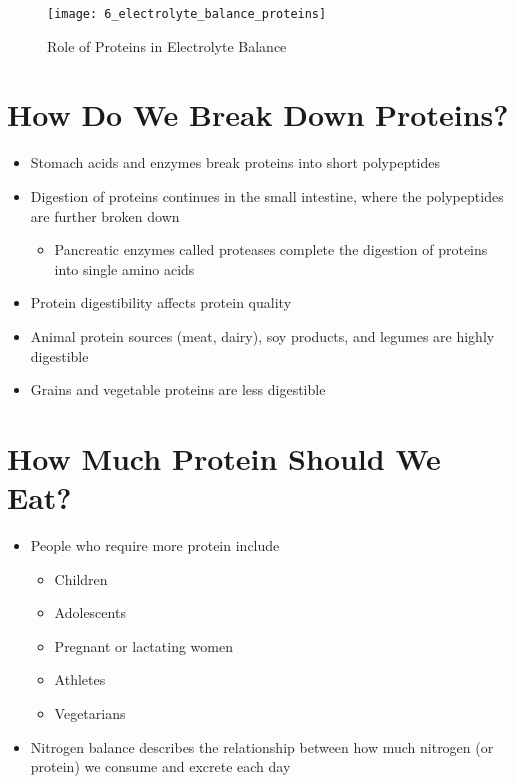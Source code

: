 \documentclass[title={Chapter 6}]{fdsn201notes}
\begin{document}
\begin{figure}[H]
	\centering
	\texttt{[image: 6\_electrolyte\_balance\_proteins]}
	\caption{Role of Proteins in Electrolyte Balance}
	\label{fig:role-of-proteins-in-electrolyte-balance}
\end{figure}

\section{How Do We Break Down Proteins?}\label{sec:how-do-we-break-down-proteins?}
\begin{itemize}
	\item Stomach acids and enzymes break proteins into short polypeptides
	\item Digestion of proteins continues in the small intestine, where the polypeptides are further broken down
	\begin{itemize}
		\item Pancreatic enzymes called proteases complete the digestion of proteins into single amino acids
	\end{itemize}
\end{itemize}

\begin{itemize}
	\item Protein digestibility affects protein quality
	\item Animal protein sources (meat, dairy), soy products, and legumes are highly digestible
	\item Grains and vegetable proteins are less digestible
\end{itemize}

\section{How Much Protein Should We Eat?}\label{sec:how-much-protein-should-we-eat?}
\begin{itemize}
	\item People who require more protein include
	\begin{itemize}
		\item Children
		\item Adolescents
		\item Pregnant or lactating women
		\item Athletes
		\item Vegetarians
	\end{itemize}
	\item Nitrogen balance describes the relationship between how much nitrogen (or protein) we consume and excrete each day
\end{itemize}
\end{document}
